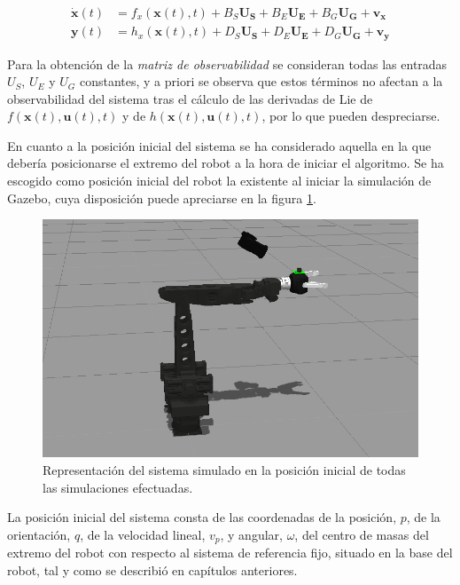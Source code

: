 \begin{subequations}
\begin{align}
	\boldsymbol{\dot{x}}(t) &= f_x(\boldsymbol{x}(t),t) + B_S\boldsymbol{U_S} + B_E\boldsymbol{U_E} + B_G\boldsymbol{U_G} + \boldsymbol{v_x}
	\label{eq:ecestado2} \\
	\boldsymbol{y}(t) &= h_x(\boldsymbol{x}(t),t) + D_S\boldsymbol{U_S} + D_E\boldsymbol{U_E} + D_G\boldsymbol{U_G} + \boldsymbol{v_y}
	\label{eq:ecsalida2}
\end{align}
\end{subequations}

Para la obtención de la \emph{matriz de observabilidad} se consideran todas las entradas $U_S$, $U_E$ y $U_G$ constantes, y a priori se observa que estos términos no afectan a la observabilidad del sistema tras el cálculo de las derivadas de Lie de $f(\boldsymbol{x}(t),\boldsymbol{u}(t),t)$ y de $h(\boldsymbol{x}(t),\boldsymbol{u}(t),t)$, por lo que pueden despreciarse. \par 

En cuanto a la posición inicial del sistema se ha considerado aquella en la que debería posicionarse el extremo del robot a la hora de iniciar el algoritmo. Se ha escogido como posición inicial del robot la existente al iniciar la simulación de Gazebo, cuya disposición puede apreciarse en la figura \ref{fig:posinicial}.

\begin{figure}[h!]
\centering
\includegraphics[scale=0.7]{Figuras/kraft-gazebo}
\caption{Representación del sistema simulado en la posición inicial de todas las simulaciones efectuadas.}
\label{fig:posinicial}
\end{figure}

La posición inicial del sistema consta de las coordenadas de la posición, $p$, de la orientación, $q$, de la velocidad lineal, $v_p$, y angular, $\omega$, del centro de masas del extremo del robot con respecto al sistema de referencia fijo, situado en la base del robot, tal y como se describió en capítulos anteriores. \par 

